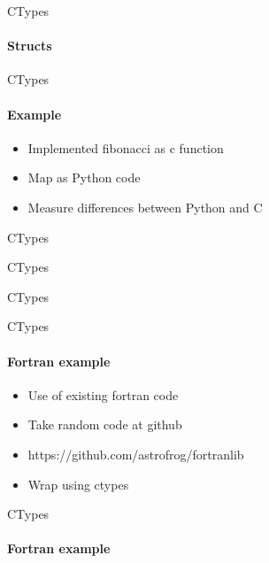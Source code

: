 \documentclass{beamer}
\begin{document}
\begin{frame}{CTypes}
  \framesubtitle{Structs}
  \begin{block}{}
  \lstctypesstruct
  \end{block}
\end{frame}


\begin{frame}{CTypes}
  \framesubtitle{Example}
  \begin{itemize}
    \item Implemented fibonacci as c function
    \item Map as Python code
    \item Measure differences between Python and C
  \end{itemize}
\end{frame}

\begin{frame}{CTypes}
  \begin{block}{}
  \lstfibc
  \end{block}
\end{frame}

\begin{frame}{CTypes}
  \begin{block}{}
  \lstfibpy
  \end{block}
\end{frame}

\begin{frame}{CTypes}
  \begin{block}{}
  \lstfibres
  \end{block}
\end{frame}


\begin{frame}{CTypes}
  \framesubtitle{Fortran example}
  \begin{itemize}
    \item Use of existing fortran code
    \item Take random code at github
    \item https://github.com/astrofrog/fortranlib
    \item Wrap using ctypes
  \end{itemize}
\end{frame}

\begin{frame}{CTypes}
  \framesubtitle{Fortran example}
  \begin{block}{}
    \lstfortran
  \end{block}
\end{frame}
\end{document}
